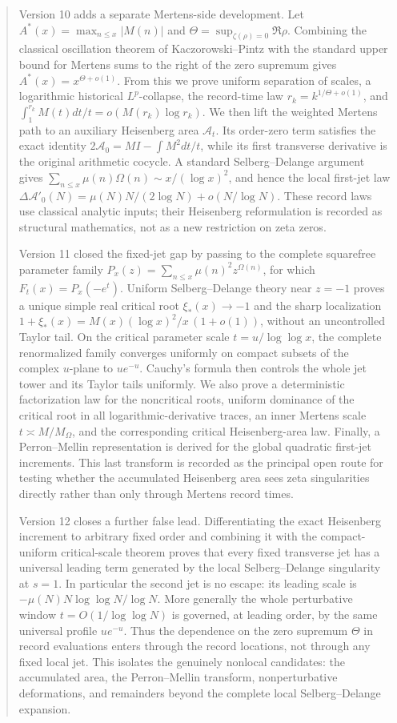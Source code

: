 \documentclass[11pt]{amsart}
\numberwithin{equation}{section}
\theoremstyle{plain}
\theoremstyle{definition}
\theoremstyle{remark}
\begin{document}
\begin{abstract}
Version 10 adds a separate Mertens-side development.  Let
\(A^*(x)=\max_{n\le x}|M(n)|\) and
\(\Theta=\sup_{\zeta(\rho)=0}\Re\rho\).  Combining the classical
oscillation theorem of Kaczorowski--Pintz with the standard upper bound for
Mertens sums to the right of the zero supremum gives
\(A^*(x)=x^{\Theta+o(1)}\).  From this we prove uniform separation of
scales, a logarithmic historical \(L^p\)-collapse, the record-time law
\(r_k=k^{1/\Theta+o(1)}\), and
\(\int_1^{r_k}M(t)dt/t=o(M(r_k)\log r_k)\).  We then lift the weighted
Mertens path to an auxiliary Heisenberg area \(\mathcal A_t\).  Its
order-zero term satisfies the exact identity
\(2\mathcal A_0=MI-\int M^2dt/t\), while its first transverse derivative
is the original arithmetic cocycle.  A standard Selberg--Delange argument
gives \(\sum_{n\le x}\mu(n)\Omega(n)\sim x/(\log x)^2\), and hence
the local first-jet law
\(\Delta\mathcal A'_0(N)=\mu(N)N/(2\log N)+o(N/\log N)\).  These
record laws use classical analytic inputs; their Heisenberg reformulation is
recorded as structural mathematics, not as a new restriction on zeta zeros.

Version 11 closed the fixed-jet gap by passing to the complete squarefree
parameter family
\(P_x(z)=\sum_{n\le x}\mu(n)^2z^{\Omega(n)}\), for which
\(F_t(x)=P_x(-e^t)\).  Uniform Selberg--Delange theory near \(z=-1\)
proves a unique simple real critical root \(\xi_*(x)\to-1\) and the sharp
localization
\(1+\xi_*(x)=M(x)(\log x)^2/x\,(1+o(1))\), without an uncontrolled Taylor
tail.  On the critical parameter scale \(t=u/\log\log x\), the complete
renormalized family converges uniformly on compact subsets of the complex
\(u\)-plane to \(u e^{-u}\).  Cauchy's formula then controls the whole jet
tower and its Taylor tails uniformly.  We also prove a deterministic
factorization law for the noncritical roots, uniform dominance of the
critical root in all logarithmic-derivative traces, an inner Mertens scale
\(t\asymp M/M_\Omega\), and the corresponding critical Heisenberg-area law.
Finally, a Perron--Mellin representation is derived for the global quadratic
first-jet increments.  This last transform is recorded as the principal open
route for testing whether the accumulated Heisenberg area sees zeta
singularities directly rather than only through Mertens record times.

Version 12 closes a further false lead.  Differentiating the exact Heisenberg
increment to arbitrary fixed order and combining it with the compact-uniform
critical-scale theorem proves that every fixed transverse jet has a universal
leading term generated by the local Selberg--Delange singularity at \(s=1\).
In particular the second jet is no escape: its leading scale is
\(-\mu(N)N\log\log N/\log N\).  More generally the whole perturbative window
\(t=O(1/\log\log N)\) is governed, at leading order, by the same universal
profile \(ue^{-u}\).  Thus the dependence on the zero supremum \(\Theta\) in
record evaluations enters through the record locations, not through any fixed
local jet.  This isolates the genuinely nonlocal candidates: the accumulated
area, the Perron--Mellin transform, nonperturbative deformations, and remainders
beyond the complete local Selberg--Delange expansion.
\end{abstract}
\end{document}
